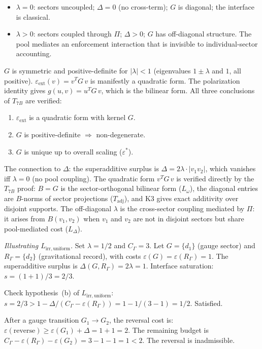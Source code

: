 \documentclass[11pt,a4paper]{article}
\theoremstyle{definition}
\newcommand{\eps}{\varepsilon}
\newenvironment{varlist}{\begin{itemize}[nosep,leftmargin=2em]}{\end{itemize}}
\begin{document}
\begin{varlist}
  \item $\lambda = 0$: sectors uncoupled; $\Delta = 0$ (no cross-term);
  $G$ is diagonal; the interface is classical.
  \item $\lambda > 0$: sectors coupled through $\Pi$; $\Delta > 0$;
  $G$ has off-diagonal structure.  The pool mediates an enforcement
  interaction that is invisible to individual-sector accounting.
\end{varlist}

\noindent $G$ is symmetric and positive-definite for $|\lambda| < 1$
(eigenvalues $1 \pm \lambda$ and $1$, all positive).
$\varepsilon_{\mathrm{ext}}(v) = v^T G\, v$ is manifestly a quadratic
form.  The polarization identity gives $g(u,v) = u^T G\, v$, which is
the bilinear form.  All three conclusions of $T_{7B}$ are verified:
\begin{enumerate}[label=(\roman*),nosep]
  \item $\varepsilon_{\mathrm{ext}}$ is a quadratic form with kernel $G$.
  \item $G$ is positive-definite $\Rightarrow$ non-degenerate.
  \item $G$ is unique up to overall scaling ($\eps^*$).
\end{enumerate}

The connection to $\Delta$: the superadditive surplus is
$\Delta = 2\lambda \cdot |v_1 v_2|$, which vanishes iff $\lambda = 0$
(no pool coupling).  The quadratic form $v^T G\, v$ is verified
directly by the $T_{7B}$ proof: $B = G$ is the sector-orthogonal
bilinear form ($L_\omega$), the diagonal entries are $B$-norms of
sector projections ($T_{\mathrm{adj}}$), and K3 gives exact additivity
over disjoint supports.  The off-diagonal $\lambda$ is the cross-sector
coupling mediated by $\Pi$: it arises from $B(v_1, v_2)$ when $v_1$ and
$v_2$ are not in disjoint sectors but share pool-mediated cost
($L_\Delta$).

\smallskip\noindent\textit{Illustrating $L_{\mathrm{irr,uniform}}$.}\quad
Set $\lambda = 1/2$ and $C_\Gamma = 3$.
Let $G = \{d_1\}$ (gauge sector) and $R_\Gamma = \{d_2\}$ (gravitational
record), with costs $\eps(G) = \eps(R_\Gamma) = 1$.
The superadditive surplus is $\Delta(G, R_\Gamma) = 2\lambda = 1$.
Interface saturation: $s = (1 + 1)/3 = 2/3$.

Check hypothesis~(b) of $L_{\mathrm{irr,uniform}}$:
$s = 2/3 > 1 - \Delta/(C_\Gamma - \eps(R_\Gamma))
= 1 - 1/(3 - 1) = 1/2$.  Satisfied.

After a gauge transition $G_1 \to G_2$, the reversal cost is:
$\eps(\text{reverse}) \ge \eps(G_1) + \Delta = 1 + 1 = 2$.
The remaining budget is $C_\Gamma - \eps(R_\Gamma) - \eps(G_2)
= 3 - 1 - 1 = 1 < 2$.  The reversal is inadmissible.
\end{document}
